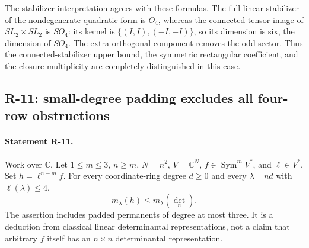 The stabilizer interpretation agrees with these formulas.
The full linear stabilizer of the nondegenerate quadratic form is
$O_4$, whereas the connected tensor image of $SL_2\times SL_2$ is
$SO_4$: its kernel is $\{(I,I),(-I,-I)\}$, so its dimension is six,
the dimension of $SO_4$. The extra orthogonal component removes
the odd sector. Thus the connected-stabilizer upper bound, the
symmetric rectangular coefficient, and the closure multiplicity
are completely distinguished in this case.

\subsection{R-11: small-degree padding excludes all four-row obstructions}

\paragraph{Statement R-11.}
Work over $\mathbb C$. Let $1\leq m\leq3$, $n\geq m$, $N=n^2$,
$V=\mathbb C^N$, $f\in\operatorname{Sym}^mV^*$, and $\ell\in V^*$.
Set $h=\ell^{n-m}f$. For every coordinate-ring degree $d\geq0$
and every $\lambda\vdash nd$ with $\ell(\lambda)\leq4$,
\begin{equation}\label{R11:fourrow}
 m_\lambda(h)\leq m_\lambda(\det_n).
\end{equation}
The assertion includes padded permanents of degree at most three.
It is a deduction from classical linear determinantal
representations, not a claim that arbitrary $f$ itself has an
$n\times n$ determinantal representation.

